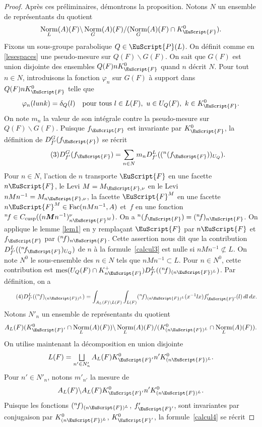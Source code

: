\documentclass[JEP,XML,SOM,Unicode,francais]{cedram}
\let\mathcal \EuScript
\let\oldbigsqcup\bigsqcup
\renewcommand{\bigsqcup}{\mathop{\textstyle\oldbigsqcup}\displaylimits}
\newcommand{\nf}{{}^n\!f}
\newcommand{\cusp}{\mathrm{cusp}}
\newcommand{\Fac}{\mathrm{Fac}}
\DeclareMathOperator{\mes}{mes}
\DeclareMathOperator{\Norm}{Norm}
\newcommand{\bM}{\boldsymbol{M}}
\newcommand{\cF}{\mathcal{F}}
\newcommand{\cP}{\mathcal{P}}
\theoremstyle{plain}
\theoremstyle{definition}
\begin{document}
\begin{proof}
Après ces préliminaires, démontrons la proposition. Notons $N$ un ensemble de représentants du quotient
\[
\Norm_{L}(A)(F)\backslash \Norm_{G}(A)(F)/(\Norm_{G}(A)(F)\cap K_{\cF}^0).
\]
Fixons un sous-groupe parabolique $Q \in \cP(L)$. On définit comme en \ref{lesespaces} une pseudo-mesure sur $Q(F)\backslash G(F)$. On sait que $G(F)$ est union disjointe des ensembles $Q(F)nK_{\cF}^0$ quand $n$ décrit $N$. Pour tout $n\in N$, introduisons la fonction $\varphi_{n}$ sur $G(F)$ à support dans $Q(F)nK_{\cF}^0$ telle que
\[
\varphi_{n}(lunk)=\delta_{Q}(l)\quad\text{pour tous } l\in L(F),\ u\in U_{Q}(F),\ k\in K_{\cF}^0.
\]
On note $m_{n}$ la valeur de son intégrale contre la pseudo-mesure sur $Q(F)\backslash G(F)$.
Puisque $f_{\cF}$ est invariante par $K_{\cF}^0$, la définition de $D^G_{f'}(f_{\cF})$ se récrit
\begin{equation}\tag{3}\label{calcul3}
D^G_{f'}(f_{\cF})= \sum_{n\in N}m_{n}D_{f'}^L((^n(f_{\cF}))_{U_{Q}}).
\end{equation}
Pour $n\in N$, l'action de $n$ transporte $\cF$ en une facette $n\cF$, le Levi $M=M_{\cF,\nu}$ en le Levi $nMn^{-1}=M_{n\cF,\nu}$, la facette $\cF^M$ en une facette $n\cF^M\in \Fac(nMn^{-1},A)$ et~$f$ en une fonction $\nf\in C_{\cusp}(({n\bM n^{-1}})_{n\cF^M}^{\nu})$. On a $^n(f_{\cF})=(\nf)_{n\cF}$. On applique le lemme \ref{lem1} en y remplaçant $\cF$ par $n\cF$ et $f_{\cF}$ par $(\nf)_{n\cF}$. Cette assertion nous dit que la contribution $D_{f'}^L((\nf_{\cF})_{U_{Q}})$ de $n$ à la formule~\eqref{calcul3} est nulle si $nMn^{-1}\not\subset L$. On note $N^0$ le sous-ensemble des $n\in N$ tels que $nMn^{-1}\subset L$. Pour $n\in N^0$, cette contribution est $\mes(U_{Q}(F)\cap K_{n\cF}^+)D_{f'}^L((\nf)_{(n\cF)^L})$. Par définition, on a
\begin{equation}\tag{4}\label{calcul4}
D_{f'}^L((\nf)_{(n\cF)^L})=\int_{A_{L}(F)\backslash L(F)} \int_{L(F)}(\nf)_{(n\cF)^L}(x^{-1}lx)f'_{\cF'}(l)\,dl\,dx.
\end{equation}
Notons $ N'_{n}$ un ensemble de représentants du quotient
\[
A_{L}(F)(K_{\cF'}^0\cap \Norm_{L}(A)(F))\backslash \Norm_{L}(A)(F)/(K_{(n\cF)^L}^0\cap \Norm_{L}(A)(F)).
\]
On utilise maintenant la décomposition en union disjointe
\[
L(F)=\bigsqcup_{n'\in N'_{n}} A_{L}(F)K_{\cF'}^0n'K_{(n\cF)^L}^0.
\]
Pour $n'\in N'_{n}$, notons $m'_{n'}$ la mesure de
\[
A_{L}(F)\backslash A_{L}(F)K_{\cF'}^0n'K_{(n\cF)^L}^0.
\]
Puisque les fonctions $(\nf)_{(n\cF)^L}$, \resp $f'_{\cF'}$, sont invariantes par conjugaison par $K_{(n\cF)^L}^0$, \resp $K_{\cF'}^0$, la formule~\eqref{calcul4} se récrit

\end{proof}
\end{document}
